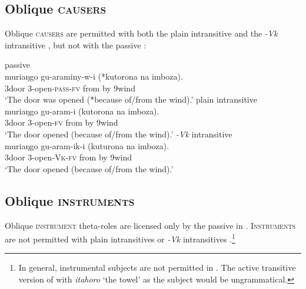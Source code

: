 \documentclass[output=paper]{langsci/lanmgscibook}
\begin{document}
\subsection{Oblique \textsc{causers}}

Oblique \textsc{causers} are permitted with both the plain intransitive  and the \textit{-Vk} intransitive , but not with the passive :

\ea\label{ex:gluckman:8} 
  \ea\label{ex:gluckman:8a} 
  {{passive}}\\
  \gll muriaŋgo gu-araminy-w-i  (*kutorona na imboza).\\
      3door 3-open-\textsc{pass}-\textsc{fv}      from   by 9wind\\
  \glt ‘The door was opened (*because of/from the wind).’
  \ex\label{ex:gluckman:8b} 
  { {plain intransitive}}\\
  \gll muriaŋgo gu-aram-i (kutorona na imboza).\\
      3door 3-open-\textsc{fv}    from by 9wind\\
  \glt ‘The door opened (because of/from the wind).’
  \ex\label{ex:gluckman:8c} 
  { {\textit{-Vk}} {intransitive}}\\
  \gll muriaŋgo gu-aram-ik-i    (kuturona na imboza).\\
      3door       3-open\textit{-}\textsc{Vk}-\textsc{fv}   from       by 9wind\\
  \glt ‘The door opened (because of/from the wind).’
  \z
\z

\subsection{Oblique \textsc{instruments}}

Oblique \textsc{instrument} theta-roles are licensed only by the passive in  . \textsc{Instruments} are not permitted with plain intransitives  or \textit{-Vk} intransitives .\footnote{In general, instrumental subjects are not permitted in . The active transitive version of  with \textit{itahoro} ‘the towel’ as the subject would be ungrammatical.}
\end{document}
